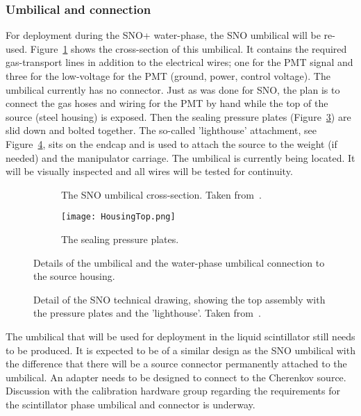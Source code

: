 \subsubsection{Umbilical and connection}
For deployment during the SNO+ water-phase, the SNO \Li umbilical will be re-used. Figure~\ref{fig:sno_umbilical} shows the cross-section of this umbilical. It contains the required gas-transport lines in addition to the electrical wires; one for the PMT signal and three for the low-voltage for the PMT (ground, power, control voltage). The umbilical currently has no connector. Just as was done for SNO, the plan is to connect the gas hoses and wiring for the PMT by hand while the top of the source (steel housing) is exposed. Then the sealing pressure plates (Figure~\ref{fig:pressureplates}) are slid down and bolted together. The so-called 'lighthouse' attachment, see Figure~\ref{fig:connection}, sits on the endcap and is used to attach the source to the weight (if needed) and the manipulator carriage. The umbilical is currently being located. It will be visually inspected and all wires will be tested for continuity.

\begin{figure}
\begin{subfigure}{.57\textwidth}
\caption{\label{fig:sno_umbilical} The SNO \Li umbilical cross-section. Taken from~\cite{Tagg:2001}.}
\end{subfigure}
\hspace{0.5cm}
\begin{subfigure}{.35\textwidth}
  \texttt{[image: HousingTop.png]}
  \caption{\label{fig:pressureplates} The sealing pressure plates.}
\end{subfigure}
\caption{Details of the umbilical and the water-phase umbilical connection to the source housing.}
\end{figure}

\begin{figure}
\caption{\label{fig:connection}Detail of the SNO \Li technical drawing, showing the top assembly with the pressure plates and the 'lighthouse'. Taken from~\cite{Tagg:2001}.}
\end{figure}

The umbilical that will be used for deployment in the liquid scintillator still needs to be produced. It is expected to be of a similar design as the SNO \Li umbilical with the difference that there will be a source connector permanently attached to the umbilical. An adapter needs to be designed to connect to the Cherenkov source. Discussion with the calibration hardware group regarding the requirements for the scintillator phase umbilical and connector is underway.
